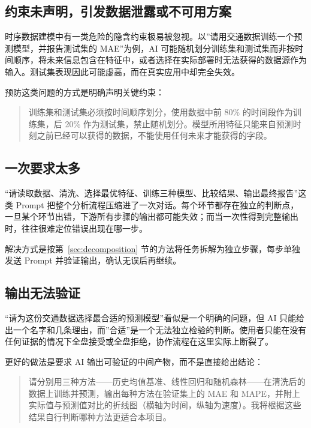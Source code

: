 \subsection{约束未声明，引发数据泄露或不可用方案}

时序数据建模中有一类危险的隐含约束极易被忽视。以”请用交通数据训练一个预测模型，并报告测试集的 MAE”为例，AI 可能随机划分训练集和测试集而非按时间顺序，将未来信息包含在特征中，或者选择在实际部署时无法获得的数据源作为输入。测试集表现因此可能虚高，而在真实应用中却完全失效。

预防这类问题的方式是明确声明关键约束：

\begin{quote}
训练集和测试集必须按时间顺序划分，使用数据中前 80\% 的时间段作为训练集，后 20\% 作为测试集，禁止随机划分。模型所用特征只能来自预测时刻之前已经可以获得的数据，不能使用任何未来才能获得的字段。
\end{quote}

\subsection{一次要求太多}

“请读取数据、清洗、选择最优特征、训练三种模型、比较结果、输出最终报告”这类 Prompt 把整个分析流程压缩进了一次对话。每个环节都存在独立的判断点，一旦某个环节出错，下游所有步骤的输出都可能失效；而当一次性得到完整输出时，往往很难定位错误出现在哪一步。

解决方式是按第~\ref{sec:decomposition} 节的方法将任务拆解为独立步骤，每步单独发送 Prompt 并验证输出，确认无误后再继续。

\subsection{输出无法验证}

“请为这份交通数据选择最合适的预测模型”看似是一个明确的问题，但 AI 只能给出一个名字和几条理由，而”合适”是一个无法独立检验的判断。使用者只能在没有任何证据的情况下全盘接受或全盘拒绝，协作流程在这里实际上断裂了。

更好的做法是要求 AI 输出可验证的中间产物，而不是直接给出结论：

\begin{quote}
请分别用三种方法——历史均值基准、线性回归和随机森林——在清洗后的数据上训练并预测，输出每种方法在验证集上的 MAE 和 MAPE，并附上实际值与预测值对比的折线图（横轴为时间，纵轴为速度）。我将根据这些结果自行判断哪种方法更适合本项目。
\end{quote}

